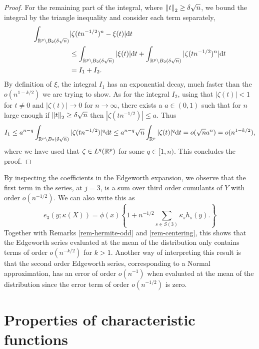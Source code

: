 \begin{proof}
    For the remaining part of the integral, where $\norm{t}_2 \geq \delta \sqrt{n}$, we bound the integral by the triangle inequality and consider each term separately,
    \begin{align*}
        \int_{\Rp \setminus B_2(\delta\sqrt{n})} &|\zeta(tn^{-1/2})^n - \xi(t)| \d t \\
        &\leq \int_{\Rp \setminus B_2(\delta\sqrt{n})} |\xi(t)| \d t + \int_{\Rp \setminus B_2(\delta\sqrt{n})} |\zeta(tn^{-1/2})^n| \d t\\
        &= I_1 + I_2.
    \end{align*}
    By definition of $\xi$, the integral $I_1$ has an exponential decay, much faster than the $o(n^{1 - k/2})$ we are trying to show. As for the integral $I_2$, using that $|\zeta(t)| < 1$ for $t \neq 0$ and $|\zeta(t)| \rightarrow 0$ for $n \rightarrow \infty$, there exists a $a \in (0, 1)$ such that for $n$ large enough if $\norm{t}_2 \geq \delta\sqrt{n}$ then $|\zeta(tn^{-1/2})| \leq a$. Thus
    \begin{equation*}
        I_1 \leq a^{n-q} \int_{\Rp \setminus B_2(\delta\sqrt{n})} |\zeta(tn^{-1/2})|^q \d t \leq a^{n-q}\sqrt{n}\intRp{t}{|\zeta(t)|^q} = o(\sqrt{n}a^n) = o(n^{1-k/2}),
    \end{equation*}
    where we have used that $\zeta \in L^q(\Rp)$ for some $q \in [1, n)$. This concludes the proof.
\end{proof}

\begin{remark} \label{rem-edge-mean}
    By inspecting the coefficients in the Edgeworth expansion, we observe that the first term in the series, at $j = 3$, is a sum over third order cumulants of $Y$ with order $o(n^{-1/2})$. We can also write this as
    \begin{equation}
        e_3(y; \kappa(X)) = \phi(x) \left\{
            1 + n^{-1/2} \sum_{s \in S(3)} \kappa_s h_s(y).
        \right\}
    \end{equation}
    Together with Remarks \ref{rem-hermite-odd} and \ref{rem-centering}, this shows that the Edgeworth series evaluated at the mean of the distribution only contains terms of order $o(n^{-k/2})$ for $k > 1$. Another way of interpreting this result is that the second order Edgeworth series, corresponding to a Normal approximation, has an error of order $o(n^{-1})$ when evaluated at the mean of the distribution since the error term of order $o(n^{-1/2})$ is zero.
\end{remark}


\section{Properties of characteristic functions}

